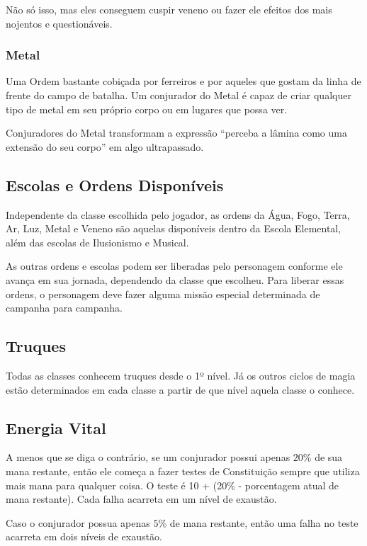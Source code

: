 \documentclass{RPG_Adventure}[2021/10/20]
\begin{document}
\begin{multicols}{2}
Não só isso, mas eles conseguem cuspir veneno ou fazer ele efeitos dos mais
nojentos e questionáveis.

\subsubsection*{Metal}%

Uma Ordem bastante cobiçada por ferreiros e por aqueles que gostam da linha de
frente do campo de batalha. Um conjurador do Metal é capaz de criar qualquer
tipo de metal em seu próprio corpo ou em lugares que possa ver.

Conjuradores do Metal transformam a expressão ``perceba a lâmina como uma
extensão do seu corpo'' em algo ultrapassado.

\subsection*{Escolas e Ordens Disponíveis}%

Independente da classe escolhida pelo jogador, as ordens da Água, Fogo, Terra,
Ar, Luz, Metal e Veneno são aquelas disponíveis dentro da Escola Elemental, além
das escolas de Ilusionismo e Musical.

As outras ordens e escolas podem ser liberadas pelo personagem conforme ele
avança em sua jornada, dependendo da classe que escolheu. Para liberar essas
ordens, o personagem deve fazer alguma missão especial determinada de campanha
para campanha.

\subsection*{Truques}%

Todas as classes conhecem truques desde o 1º nível. Já os outros ciclos de magia
estão determinados em cada classe a partir de que nível aquela classe o conhece.

\subsection*{Energia Vital}%

A menos que se diga o contrário, se um conjurador possui apenas $20\%$ de sua
mana restante, então ele começa a fazer testes de Constituição sempre que
utiliza mais mana para qualquer coisa. O teste é 10 + (20\% - porcentagem atual
de mana restante).  Cada falha acarreta em um nível de exaustão.

Caso o conjurador possua apenas $5\%$ de mana restante, então uma falha no teste
acarreta em dois níveis de exaustão.


\end{multicols}
\end{document}
